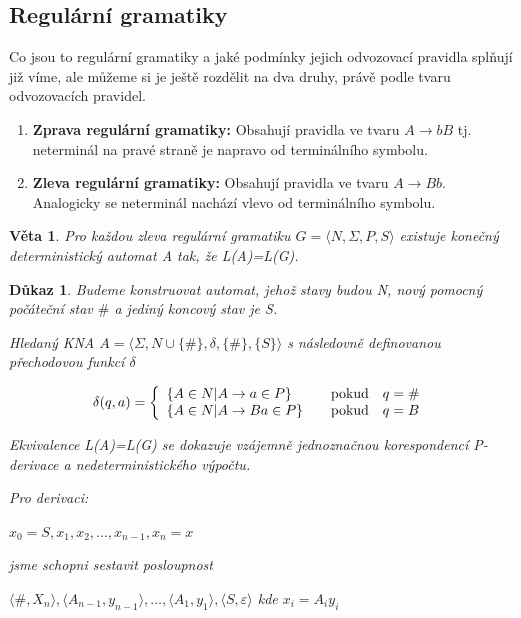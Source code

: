\documentclass[10pt, a4paper, titlepage]{article}
\theoremstyle{note}
\newtheorem{veta}{Věta}
\newtheorem{dukaz}{Důkaz}
\begin{document}
\subsection{Regulární gramatiky}

Co jsou to regulární gramatiky a jaké podmínky jejich odvozovací pravidla splňují již víme, ale můžeme si je ještě rozdělit na dva druhy, právě podle tvaru odvozovacích pravidel.

\begin{enumerate}

\item
\textbf{Zprava regulární gramatiky:}
Obsahují pravidla ve tvaru $ A \rightarrow bB $ tj. neterminál na pravé straně je napravo od terminálního symbolu.
\item
\textbf{Zleva regulární gramatiky:}
Obsahují pravidla ve tvaru $ A \rightarrow Bb $. Analogicky se neterminál nachází vlevo od terminálního symbolu.
\end{enumerate}

\begin{veta}
Pro každou zleva regulární gramatiku $ G = \langle N,\Sigma,P,S \rangle $ existuje konečný deterministický automat \textit{A} tak, že \textit{L(A)=L(G)}.
\end{veta}

\begin{dukaz}
Budeme konstruovat automat, jehož stavy budou \textit{N}, nový pomocný počáteční stav $ \# $ a jediný koncový stav je \textit{S}.

Hledaný KNA $ A = \langle \Sigma,N \cup \lbrace \# \rbrace,\delta,\lbrace \# \rbrace,\lbrace S \rbrace \rangle$ s následovně definovanou přechodovou funkcí $\delta$

$$
\delta(q,a)=\left\{
\begin{array}{l@{\quad\mbox{}\quad}l}
\lbrace A \in N | A \rightarrow a \in P \rbrace & \text{pokud}\quad q=\#\\
\lbrace A \in N | A \rightarrow Ba \in P \rbrace & \text{pokud}\quad q=B\\
\end{array}
\right.
$$ 

Ekvivalence \textit{L(A)=L(G)} se dokazuje vzájemně jednoznačnou korespondencí P-derivace a nedeterministického výpočtu.

Pro derivaci:

$ x_0=S,x_1,x_2,\ldots,x_{n-1},x_n=x $

jsme schopni sestavit posloupnost

$ \langle \# , X_n \rangle,\langle A_{n-1} , y_{n-1} \rangle,\ldots,\langle A_1 , y_1 \rangle,\langle S , \varepsilon \rangle $ kde $x_i=A_{i}y_{i}$
\end{dukaz}
\end{document}
